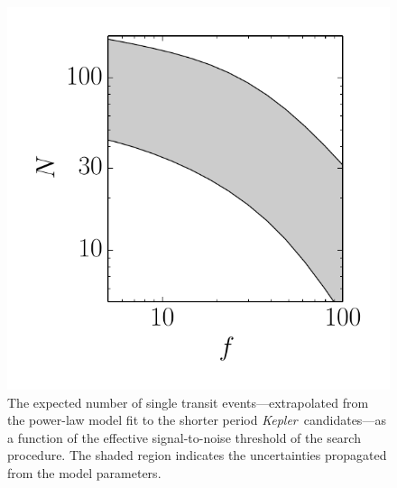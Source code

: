 \documentclass[12pt,preprint]{aastex}
\newcommand{\project}[1]{\textsl{#1}}
\newcommand{\kepler}{\project{Kepler}}
\newcommand{\figlabel}[1]{\label{fig:#1}}
\begin{document}
\begin{figure}[p]
\begin{center}
\includegraphics{figures/predict.pdf}
\end{center}
\caption{%
The expected number of single transit events---extrapolated from the
\citet{Dong:2013} power-law model fit to the shorter period \kepler\
candidates---as a function of the effective signal-to-noise threshold of the
search procedure.
The shaded region indicates the uncertainties propagated from the model
parameters.
\figlabel{predict}}
\end{figure}


\clearpage

\clearpage


\end{document}

